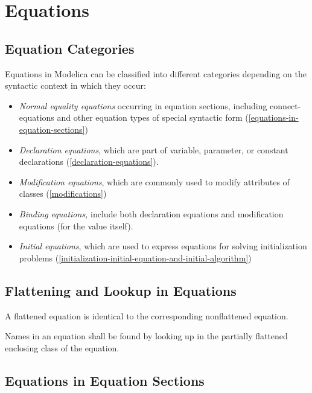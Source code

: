 \chapter{Equations}

\section{Equation Categories}

Equations in Modelica can be classified into different categories
depending on the syntactic context in which they occur:

\begin{itemize}
\item
  \emph{Normal equality equations} occurring in equation sections,
  including connect-equations and other equation types of special
  syntactic form (\autoref{equations-in-equation-sections})
\item
  \emph{Declaration equations}, which are part of variable, parameter,
  or constant declarations (\autoref{declaration-equations}).
\item
  \emph{Modification equations}, which are commonly used to modify
  attributes of classes (\autoref{modifications})
\item
  \emph{Binding equations,} include both declaration equations and
  modification equations (for the value itself).
\item
  \emph{Initial equations}, which are used to express equations for
  solving initialization problems (\autoref{initialization-initial-equation-and-initial-algorithm})
\end{itemize}

\section{Flattening and Lookup in Equations}

A flattened equation is identical to the corresponding nonflattened
equation.

Names in an equation shall be found by looking up in the partially
flattened enclosing class of the equation.

\section{Equations in Equation Sections}

